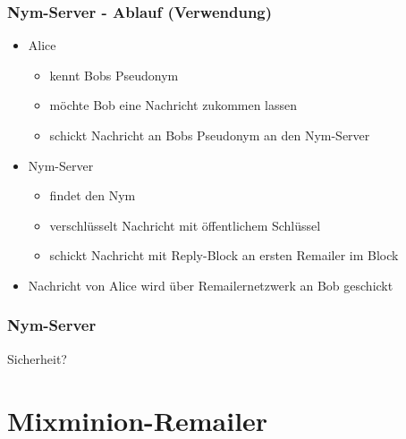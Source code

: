 \documentclass{beamer}
\begin{document}
\begin{frame}
	\frametitle{Nym-Server - Ablauf (Verwendung)}

	\begin{itemize}
		\item Alice 
		\begin{itemize}
			\item kennt Bobs Pseudonym
			\item möchte Bob eine Nachricht zukommen lassen
			\item schickt Nachricht an Bobs Pseudonym an den Nym-Server
		\end{itemize}

		\pause

		\item Nym-Server
		\begin{itemize}
			\item findet den Nym
			\item verschlüsselt Nachricht mit öffentlichem Schlüssel
			\item schickt Nachricht mit Reply-Block an ersten Remailer im Block
		\end{itemize}

		\item Nachricht von Alice wird über Remailernetzwerk an Bob geschickt
	\end{itemize}
\end{frame}

\begin{frame}
	\frametitle{Nym-Server}
	\centering
	Sicherheit?
\end{frame}

\section{Mixminion-Remailer}




\end{document}
